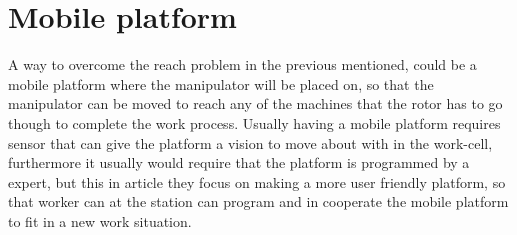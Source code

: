 \section{Mobile platform}
A way to overcome the reach problem in the previous mentioned, could be a mobile platform where the manipulator will be placed on, so that the manipulator can be moved to reach any of the machines that the rotor has to go though to complete the work process. Usually having a mobile platform requires sensor that can give the platform a vision to move about with in the work-cell\cite{doi:10.1177/1729881417718588}, furthermore it usually would require that the platform is programmed by a expert, but this in article \cite{doi:10.1177/1729881417718588} they focus on making a more user friendly platform, so that worker can at the station can program and in cooperate the mobile platform to fit in a new work situation.

